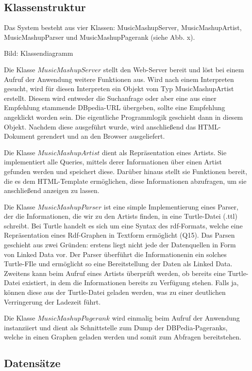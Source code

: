 \subsection{Klassenstruktur}


Das System besteht aus vier Klassen: MusicMashupServer, MusicMashupArtist, MusicMashupParser und MusicMashupPagerank (siehe Abb. x).


Bild: Klassendiagramm


Die Klasse $MusicMashupServer$ stellt den Web-Server bereit und löst bei einem Aufruf der Anwendung weitere Funktionen aus. Wird nach einem Interpreten gesucht, wird für diesen Interpreten ein Objekt vom Typ MusicMashupArtist erstellt. Diesem wird entweder die Suchanfrage oder aber eine aus einer Empfehlung stammende DBpedia-URL übergeben, sollte eine Empfehlung angeklickt worden sein. Die eigentliche Programmlogik geschieht dann in diesem Objekt. Nachdem diese ausgeführt wurde, wird anschließend das HTML-Dokument gerendert und an den Browser ausgeliefert.


Die Klasse $MusicMashupArtist$ dient als Repräsentation eines Artists. Sie implementiert alle Queries, mittels derer Informationen über einen Artist gefunden werden und speichert diese. Darüber hinaus stellt sie Funktionen bereit, die es dem HTML-Template ermöglichen, diese Informationen abzufragen, um sie anschließend anzeigen zu lassen.


Die Klasse $MusicMashupParser$ ist eine simple Implementierung eines Parser, der die Informationen, die wir zu den Artists finden, in eine Turtle-Datei (.ttl) schreibt. Bei Turtle handelt es sich um eine Syntax des rdf-Formats, welche eine Repräsentation eines Rdf-Graphen in Textform ermöglicht (Q15). Das Parsen geschieht aus zwei Gründen: erstens liegt nicht jede der Datenquellen in Form von Linked Data vor. Der Parser überführt die Informationenin ein solches Turtle-FIle und ermöglicht so eine Bereitstellung der Daten als Linked Data.  Zweitens kann beim Aufruf eines Artists überprüft werden, ob bereits eine Turtle-Datei existiert, in dem die Informationen bereits zu Verfügung stehen. Falls ja, können diese aus der Turtle-Datei geladen werden, was zu einer deutlichen Verringerung der Ladezeit führt.


Die Klasse $MusicMashupPagerank$ wird einmalig beim Aufruf der Anwendung instanziiert und dient als Schnittstelle zum Dump der DBPedia-Pageranks, welche in einen Graphen geladen werden und somit zum Abfragen bereitstehen.

\subsection{Datensätze}

